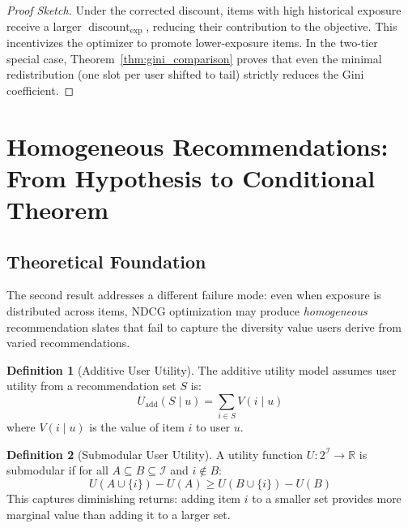 \documentclass[11pt,a4paper]{article}
\theoremstyle{definition}
\newtheorem{definition}{Definition}[section]
\theoremstyle{plain}
\theoremstyle{remark}
\newcommand{\R}{\mathbb{R}}
\DeclareMathOperator{\discount}{discount}
\begin{document}
\begin{proof}[Proof Sketch]
Under the corrected discount, items with high historical exposure receive a larger $\discount_{\text{exp}}$, reducing their contribution to the objective. This incentivizes the optimizer to promote lower-exposure items. In the two-tier special case, Theorem~\ref{thm:gini_comparison} proves that even the minimal redistribution (one slot per user shifted to tail) strictly reduces the Gini coefficient.
\end{proof}

\section{Homogeneous Recommendations: From Hypothesis to Conditional Theorem}
\label{sec:hypothesis2}

\subsection{Theoretical Foundation}
\label{subsec:h2_foundation}

The second result addresses a different failure mode: even when exposure is distributed across items, NDCG optimization may produce \textit{homogeneous} recommendation slates that fail to capture the diversity value users derive from varied recommendations.

\begin{definition}[Additive User Utility]
\label{def:additive_utility}
The additive utility model assumes user utility from a recommendation set $S$ is:
\begin{equation}
    U_{\text{add}}(S \mid u) = \sum_{i \in S} V(i \mid u)
\end{equation}
where $V(i \mid u)$ is the value of item $i$ to user $u$.
\end{definition}

\begin{definition}[Submodular User Utility]
\label{def:submodular_utility}
A utility function $U: 2^{\mathcal{I}} \rightarrow \R$ is submodular if for all $A \subseteq B \subseteq \mathcal{I}$ and $i \notin B$:
\begin{equation}
    U(A \cup \{i\}) - U(A) \geq U(B \cup \{i\}) - U(B)
\end{equation}
This captures diminishing returns: adding item $i$ to a smaller set provides more marginal value than adding it to a larger set.
\end{definition}
\end{document}
